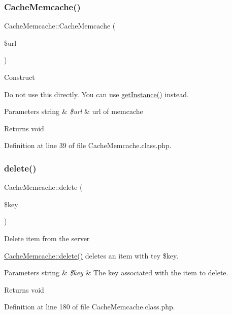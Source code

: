 \subsubsection{\texorpdfstring{Cache\+Memcache()}{CacheMemcache()}}
{\footnotesize\ttfamily Cache\+Memcache\+::\+Cache\+Memcache (\begin{DoxyParamCaption}\item[{}]{\$url }\end{DoxyParamCaption})}

Construct

Do not use this directly. You can use \hyperlink{classCacheMemcache_a951aa78ba49fdb971def3e2bb8b7db2e}{get\+Instance()} instead. 
\begin{DoxyParams}[1]{Parameters}
string & {\em \$url} & url of memcache \\
\hline
\end{DoxyParams}
\begin{DoxyReturn}{Returns}
void 
\end{DoxyReturn}


Definition at line 39 of file Cache\+Memcache.\+class.\+php.

\hypertarget{classCacheMemcache_aca057fd092e1a938410a20e16d2d2d7f}{}\label{classCacheMemcache_aca057fd092e1a938410a20e16d2d2d7f} 
\subsubsection{\texorpdfstring{delete()}{delete()}}
{\footnotesize\ttfamily Cache\+Memcache\+::delete (\begin{DoxyParamCaption}\item[{}]{\$key }\end{DoxyParamCaption})}

Delete item from the server

\hyperlink{classCacheMemcache_aca057fd092e1a938410a20e16d2d2d7f}{Cache\+Memcache\+::delete()} deletes an item with tey \$key.


\begin{DoxyParams}[1]{Parameters}
string & {\em \$key} & The key associated with the item to delete. \\
\hline
\end{DoxyParams}
\begin{DoxyReturn}{Returns}
void 
\end{DoxyReturn}


Definition at line 180 of file Cache\+Memcache.\+class.\+php.

